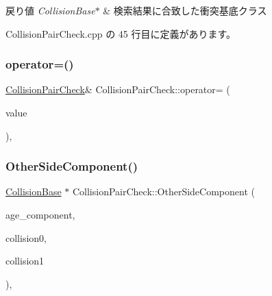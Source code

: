 \begin{DoxyRetVals}{戻り値}
{\em Collision\+Base$\ast$} & 検索結果に合致した衝突基底クラス \\
\hline
\end{DoxyRetVals}


 Collision\+Pair\+Check.\+cpp の 45 行目に定義があります。

\mbox{\label{class_collision_pair_check_a32ebe7303801a6bfa9225c60ddb4b749}} 
\subsubsection{\texorpdfstring{operator=()}{operator=()}}
{\footnotesize\ttfamily \mbox{\hyperlink{class_collision_pair_check}{Collision\+Pair\+Check}}\& Collision\+Pair\+Check\+::operator= (\begin{DoxyParamCaption}\item[{const \mbox{\hyperlink{class_collision_pair_check}{Collision\+Pair\+Check}} \&}]{value }\end{DoxyParamCaption})\hspace{0.3cm}{\ttfamily [private]}, {\ttfamily [delete]}}

\mbox{\label{class_collision_pair_check_a97c459f98bce9f88d9f506423395c40c}} 
\subsubsection{\texorpdfstring{Other\+Side\+Component()}{OtherSideComponent()}}
{\footnotesize\ttfamily \mbox{\hyperlink{class_collision_base}{Collision\+Base}} $\ast$ Collision\+Pair\+Check\+::\+Other\+Side\+Component (\begin{DoxyParamCaption}\item[{\mbox{\hyperlink{class_collision_base}{Collision\+Base}} $\ast$}]{age\+\_\+component,  }\item[{\mbox{\hyperlink{class_collision_base}{Collision\+Base}} $\ast$}]{collision0,  }\item[{\mbox{\hyperlink{class_collision_base}{Collision\+Base}} $\ast$}]{collision1 }\end{DoxyParamCaption})\hspace{0.3cm}{\ttfamily [static]}, {\ttfamily [private]}}



